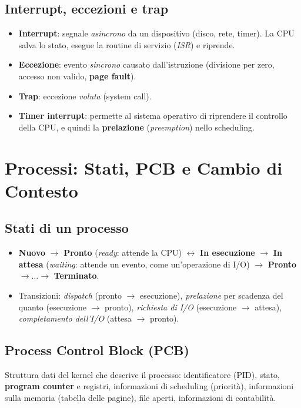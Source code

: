 \subsection{Interrupt, eccezioni e trap}
\begin{itemize}
    \item \textbf{Interrupt}: segnale \emph{asincrono} da un dispositivo (disco, rete, timer). La CPU salva lo stato, esegue la routine di servizio (\emph{ISR}) e riprende.
    \item \textbf{Eccezione}: evento \emph{sincrono} causato dall'istruzione (divisione per zero, accesso non valido, \textbf{page fault}).
    \item \textbf{Trap}: eccezione \emph{voluta} (system call).
    \item \textbf{Timer interrupt}: permette al sistema operativo di riprendere il controllo della CPU, e quindi la \textbf{prelazione} (\emph{preemption}) nello scheduling.
\end{itemize}

\section{Processi: Stati, PCB e Cambio di Contesto}

\subsection{Stati di un processo}
\begin{itemize}
    \item \textbf{Nuovo} $\to$ \textbf{Pronto} (\emph{ready}: attende la CPU) $\leftrightarrow$ \textbf{In esecuzione} $\to$ \textbf{In attesa} (\emph{waiting}: attende un evento, come un'operazione di I/O) $\to$ \textbf{Pronto} $\to\ldots\to$ \textbf{Terminato}.
    \item Transizioni: \emph{dispatch} (pronto $\to$ esecuzione), \emph{prelazione} per scadenza del quanto (esecuzione $\to$ pronto), \emph{richiesta di I/O} (esecuzione $\to$ attesa), \emph{completamento dell'I/O} (attesa $\to$ pronto).
\end{itemize}

\subsection{Process Control Block (PCB)}
Struttura dati del kernel che descrive il processo: identificatore (PID), stato, \textbf{program counter} e registri, informazioni di scheduling (priorità), informazioni sulla memoria (tabella delle pagine), file aperti, informazioni di contabilità.

